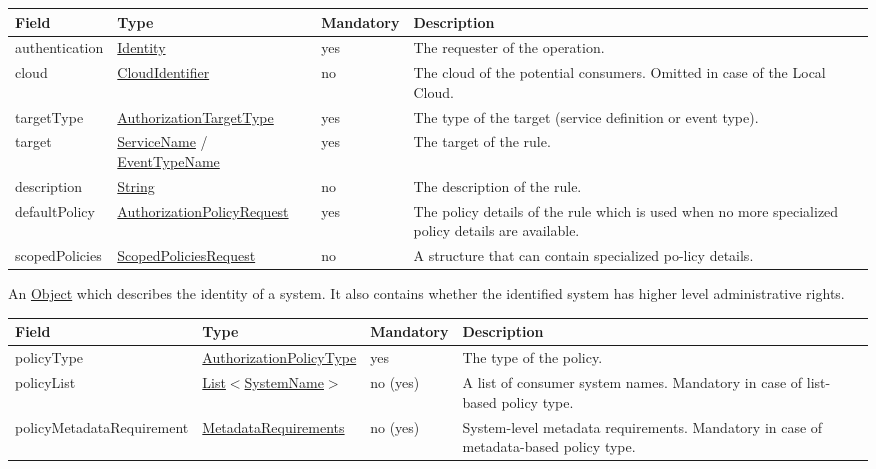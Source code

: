 \documentclass[a4paper]{arrowhead}
\newcommand{\pref}[1]{{\textcolor{ArrowheadGrey}{\hyperref[sec:model:primitives:#1]{#1}}}}
\begin{document}
{}
 
\begin{table}[ht!]
\begin{tabularx}{\textwidth}{| p{3cm} | p{4.5cm} | p{2cm} | X |} \hline
\rowcolor{gray!33} Field & Type & Mandatory & Description \\ \hline
authentication &\hyperref[sec:model:Identity]{Identity} & yes & The requester of the operation. \\ \hline
cloud & \pref{CloudIdentifier} & no & The cloud of the potential consumers. Omitted in case of the Local Cloud. \\ \hline
targetType & \pref{AuthorizationTargetType} & yes & The type of the target (service definition or event type). \\ \hline
target & \pref{ServiceName} / \pref{EventTypeName} & yes & The target of the rule. \\ \hline
description & \pref{String} & no & The description of the rule. \\ \hline
defaultPolicy & \hyperref[sec:model:AuthorizationPolicyRequest]{AuthorizationPolicyRequest} & yes & The policy details of the rule which is used when no more specialized policy details are available. \\ \hline
scopedPolicies & \hyperref[sec:model:ScopedPoliciesRequest]{ScopedPoliciesRequest} & no & A structure that can contain specialized po-licy details. \\ \hline
\end{tabularx}
\end{table}


An \pref{Object} which describes the identity of a system. It also contains whether the identified system has higher level administrative rights.


\begin{table}[ht!]
\begin{tabularx}{\textwidth}{| p{4.3cm} | p{4.1cm} | p{2cm} | X |} \hline
\rowcolor{gray!33} Field & Type & Mandatory & Description \\ \hline
policyType & \pref{AuthorizationPolicyType} & yes & The type of the policy. \\ \hline
policyList & \pref{List}$<$\pref{SystemName}$>$ & no (yes) & A list of consumer system names. Mandatory in case of list-based policy type. \\ \hline
policyMetadataRequirement & \hyperref[sec:model:MetadataRequirements]{MetadataRequirements} & no (yes) & System-level metadata requirements. Mandatory in case of metadata-based policy type. \\ \hline 
\end{tabularx}
\end{table}
\end{document}
